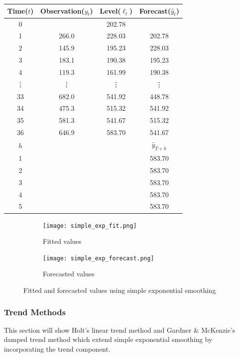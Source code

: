 \documentclass{article}
\begin{document}
  \begin{center}
    \begin{tabular}{||c c c c||} 
     \hline
     Time($t$) & Observation($y_t$) & Level($\ell_t$) & Forecast($\hat{y}_t$) \\ [0.5ex] 
     \hline
     0 &       & 202.78 &  \\ 
     \hline
     1 & 266.0 & 228.03 & 202.78 \\
     \hline
     2 & 145.9 & 195.23 & 228.03 \\
     \hline
     3 & 183.1 & 190.38 & 195.23 \\
     \hline
     4 & 119.3 & 161.99 & 190.38 \\
     \hline
     \vdots & \vdots & \vdots & \vdots \\
     \hline
     33 & 682.0 & 541.92 & 448.78 \\
     \hline
     34 & 475.3 & 515.32 & 541.92 \\
     \hline
     35 & 581.3 & 541.67 & 515.32 \\
     \hline
     36 & 646.9 & 583.70 & 541.67 \\
     \hline
     $h$ &  &  & $\hat{y}_{T+h}$ \\
     \hline
     1 &  &  & 583.70 \\
     \hline
     2 &  &  & 583.70 \\
     \hline
     3 &  &  & 583.70 \\
     \hline
     4 &  &  & 583.70 \\
     \hline
     5 &  &  & 583.70 \\
     \hline
    \end{tabular}
  \end{center}

  \begin{figure}[H]
    \centering
    \captionsetup{justification=centering}
    \begin{subfigure}[b]{0.49\linewidth}
      \texttt{[image: simple\_exp\_fit.png]}
      \caption{Fitted values}
    \end{subfigure}
    \begin{subfigure}[b]{0.49\linewidth}
      \texttt{[image: simple\_exp\_forecast.png]}
      \caption{Forecasted values}
    \end{subfigure}
    \caption{Fitted and forecasted values using simple exponential smoothing}
  \end{figure}

  \subsubsection{Trend Methods}
  This section will show Holt's linear trend method and Gardner \& McKenzie's damped trend method which extend simple exponential smoothing by incorporating the trend component.
\end{document}
